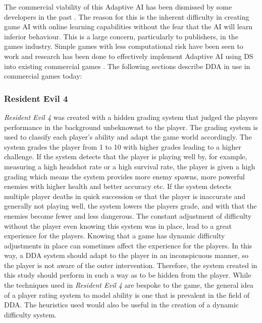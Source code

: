 \documentclass[journal]{IEEEtran}
\begin{document}
The commercial viability of this Adaptive AI has been dismissed by some developers in the past \cite{woodcock2000future} \cite{rabin2004promising}. The reason for this is the inherent difficulty in creating game AI with online learning capabilities without the fear that the AI will learn inferior behaviour. This is a large concern, particularly to publishers, in the games industry. 
Simple games with less computational risk have been seen to work \cite{demasi2003line} and research has been done to effectively implement Adaptive AI using DS into existing commercial games  \cite{spronck2006adaptive}. The following sections describe DDA in use in commercial games today:

\subsubsection{Resident Evil 4}
\textit{Resident Evil 4} \cite{game:re4} was created with a hidden grading system that judged the players performance in the background unbeknownst to the player. The grading system is used to classify each player's ability and adapt the game world accordingly. The system grades the player from 1 to 10 with higher grades leading to a higher challenge. If the system detects that the player is playing well by, for example, measuring a high headshot rate or a high survival rate, the player is given a high grading which means the system provides more enemy spawns, more powerful enemies with higher health and better accuracy etc. If the system detects multiple player deaths in quick succession or that the player is inaccurate and generally not playing well, the system lowers the players grade, and with that the enemies become fewer and less dangerous. The constant adjustment of difficulty without the player even knowing this system was in place, lead to a great experience for the players. Knowing that a game has dynamic difficulty adjustments in place can sometimes affect the experience for the players. In this way, a DDA system should adapt to the player in an inconspicuous manner, so the player is not aware of the outer intervention. Therefore, the system created in this study should perform in such a way as to be hidden from the player. 
While the techniques used in \textit{Resident Evil 4} are bespoke to the game, the general idea of a player rating system to model ability is one that is prevalent in the field of DDA. The heuristics used would also be useful in the creation of a dynamic difficulty system.  
\end{document}
